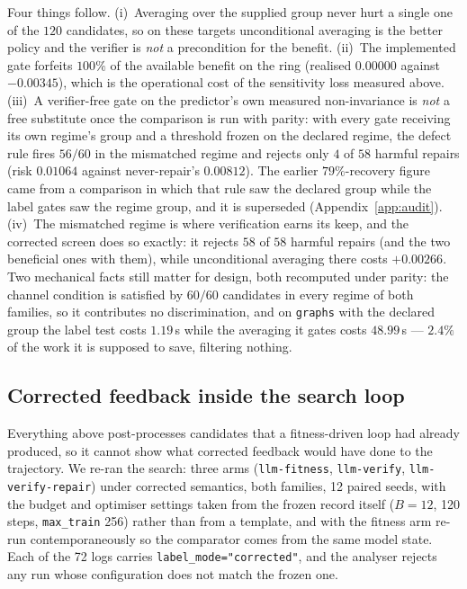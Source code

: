 \documentclass{neurips_2024}
\begin{document}
Four things follow. (i)~Averaging over the supplied group never hurt a single one of the
$120$ candidates, so on these targets unconditional averaging is the better policy and the
verifier is \emph{not} a precondition for the benefit. (ii)~The implemented gate forfeits
$100\%$ of the available benefit on the ring (realised $0.00000$ against $-0.00345$), which
is the operational cost of the sensitivity loss measured above. (iii)~A verifier-free gate on
the predictor's own measured non-invariance is \emph{not} a free substitute once the comparison
is run with parity: with every gate receiving its own regime's group and a threshold frozen on
the declared regime, the defect rule fires $56/60$ in the mismatched regime and rejects only
$4$ of $58$ harmful repairs (risk $0.01064$ against never-repair's $0.00812$). The earlier
$79\%$-recovery figure came from a comparison in which that rule saw the declared group while
the label gates saw the regime group, and it is superseded (Appendix~\ref{app:audit}).
(iv)~The mismatched regime is where verification earns its keep, and the corrected screen does
so exactly: it rejects $58$ of $58$ harmful repairs (and the two beneficial ones with them),
while unconditional averaging there costs $+0.00266$. Two mechanical facts still matter for
design, both recomputed under parity: the channel condition is satisfied by $60/60$ candidates
in every regime of both families, so it contributes no discrimination, and on \texttt{graphs}
with the declared group the label test costs $1.19$\,s while the averaging it gates costs
$48.99$\,s --- $2.4\%$ of the work it is supposed to save, filtering nothing.

\subsection{Corrected feedback inside the search loop}
\label{sec:correctedsearch}

Everything above post-processes candidates that a fitness-driven loop had already produced, so
it cannot show what corrected feedback would have done to the trajectory. We re-ran the search:
three arms (\texttt{llm-fitness}, \texttt{llm-verify}, \texttt{llm-verify-repair}) under corrected
semantics, both families, 12 paired seeds, with the budget and optimiser settings taken from the
frozen record itself ($B{=}12$, 120 steps, \texttt{max\_train} 256) rather than from a template,
and with the fitness arm re-run contemporaneously so the comparator comes from the same model
state. Each of the 72 logs carries \texttt{label\_mode="corrected"}, and the analyser rejects any
run whose configuration does not match the frozen one.
\end{document}
